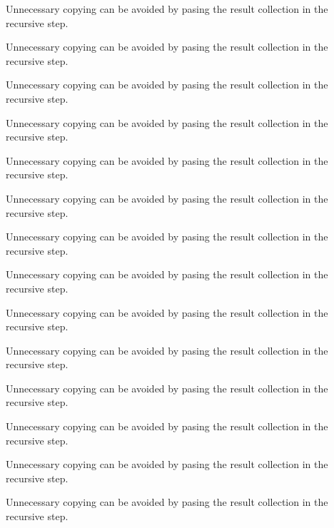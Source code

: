 \begin{DoxyRefList}
Unnecessary copying can be avoided by pasing the result collection in the recursive step. 

Unnecessary copying can be avoided by pasing the result collection in the recursive step. 

Unnecessary copying can be avoided by pasing the result collection in the recursive step. 

Unnecessary copying can be avoided by pasing the result collection in the recursive step. 

Unnecessary copying can be avoided by pasing the result collection in the recursive step. 

Unnecessary copying can be avoided by pasing the result collection in the recursive step. 

Unnecessary copying can be avoided by pasing the result collection in the recursive step. 

Unnecessary copying can be avoided by pasing the result collection in the recursive step. 

Unnecessary copying can be avoided by pasing the result collection in the recursive step. 

Unnecessary copying can be avoided by pasing the result collection in the recursive step. 

Unnecessary copying can be avoided by pasing the result collection in the recursive step. 

Unnecessary copying can be avoided by pasing the result collection in the recursive step. 

Unnecessary copying can be avoided by pasing the result collection in the recursive step. 

Unnecessary copying can be avoided by pasing the result collection in the recursive step. 


\end{DoxyRefList}
